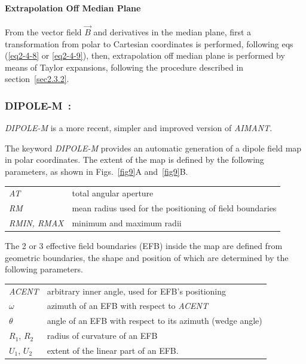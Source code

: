 \bigskip

\paragraph{Extrapolation Off Median Plane} 

\noindent From the vector field $ \vec  B $ and  derivatives in the median plane, 
first a transformation from polar to Cartesian coordinates is 
performed, following eqs (\ref{eq2-4-8} or \ref{eq2-4-9}), then,  extrapolation off median plane is 
performed by means of Taylor expansions, following the procedure described in section~\ref{sec2.3.2}. 






\newpage

\subsubsection*{DIPOLE-M~: \DIPOLEMTitl} \label{DIPOLE-M} 
\medskip

\noindent\textsl{DIPOLE-M} is a more recent, simpler and improved version of 
\textsl{AIMANT}.  
\bigskip

\noindent The keyword \textsl{DIPOLE-M} provides an automatic generation of a dipole 
field map in polar coordinates. The extent of the map is defined by the 
following parameters, as shown in Figs.~\ref{fig9}A and~\ref{fig9}B.
\bigskip

 \begin{tabular}{>{\sl}l!{~:}l}
	 AT &  total angular aperture\\
	 RM & mean radius used for the positioning of field boundaries\\
	 RMIN, RMAX
	    &  minimum and maximum radii 
 \end{tabular}
\bigskip
 
\noindent The 2 or 3 effective field boundaries (EFB) inside the map are
defined from geometric boundaries, the shape and position of which are determined by the 
following parameters. 
\bigskip

\begin{tabular}{l!{~:}l}
	 \textsl{ACENT} 
	    & arbitrary inner angle, used for EFB's positioning  \\
	$\omega$ &  azimuth of an EFB with respect to  \textsl{ACENT}\\
	$\theta$ & angle of an EFB with respect to its azimuth (wedge angle)\\ 
	$R_1$, $R_2$  &  radius of curvature of an EFB\\
	$U_1$, $U_2$  &  extent of the linear part of an EFB. 
\end{tabular}
\bigskip


